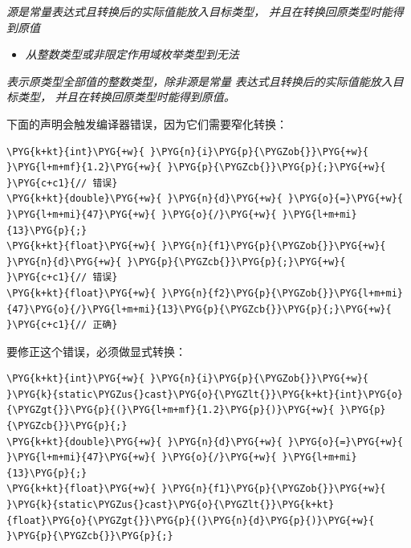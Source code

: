 
\textit{源是常量表达式且转换后的实际值能放入目标类型，} \textit{并且在转换回原类型时能得到原值}



\begin{itemize}
\item \textit{从整数类型或非限定作用域枚举类型到无法}


\end{itemize}



\textit{表示原类型全部值的整数类型，除非源是常量} \textit{表达式且转换后的实际值能放入目标类型，} \textit{并且在转换回原类型时能得到原值。}



下面的声明会触发编译器错误，因为它们需要窄化转换：



\begin{codeblockbg}
\begin{Verbatim}[commandchars=\\\{\},breaklines=true,breakanywhere=true,fontsize=\codefont,xleftmargin=17bp]
\PYG{k+kt}{int}\PYG{+w}{ }\PYG{n}{i}\PYG{p}{\PYGZob{}}\PYG{+w}{ }\PYG{l+m+mf}{1.2}\PYG{+w}{ }\PYG{p}{\PYGZcb{}}\PYG{p}{;}\PYG{+w}{           }\PYG{c+c1}{// 错误}
\PYG{k+kt}{double}\PYG{+w}{ }\PYG{n}{d}\PYG{+w}{ }\PYG{o}{=}\PYG{+w}{ }\PYG{l+m+mi}{47}\PYG{+w}{ }\PYG{o}{/}\PYG{+w}{ }\PYG{l+m+mi}{13}\PYG{p}{;}
\PYG{k+kt}{float}\PYG{+w}{ }\PYG{n}{f1}\PYG{p}{\PYGZob{}}\PYG{+w}{ }\PYG{n}{d}\PYG{+w}{ }\PYG{p}{\PYGZcb{}}\PYG{p}{;}\PYG{+w}{          }\PYG{c+c1}{// 错误}
\PYG{k+kt}{float}\PYG{+w}{ }\PYG{n}{f2}\PYG{p}{\PYGZob{}}\PYG{l+m+mi}{47}\PYG{o}{/}\PYG{l+m+mi}{13}\PYG{p}{\PYGZcb{}}\PYG{p}{;}\PYG{+w}{        }\PYG{c+c1}{// 正确}
\end{Verbatim}
\end{codeblockbg}



要修正这个错误，必须做显式转换：



\begin{codeblockbg}
\begin{Verbatim}[commandchars=\\\{\},breaklines=true,breakanywhere=true,fontsize=\codefont,xleftmargin=17bp]
\PYG{k+kt}{int}\PYG{+w}{ }\PYG{n}{i}\PYG{p}{\PYGZob{}}\PYG{+w}{ }\PYG{k}{static\PYGZus{}cast}\PYG{o}{\PYGZlt{}}\PYG{k+kt}{int}\PYG{o}{\PYGZgt{}}\PYG{p}{(}\PYG{l+m+mf}{1.2}\PYG{p}{)}\PYG{+w}{ }\PYG{p}{\PYGZcb{}}\PYG{p}{;}
\PYG{k+kt}{double}\PYG{+w}{ }\PYG{n}{d}\PYG{+w}{ }\PYG{o}{=}\PYG{+w}{ }\PYG{l+m+mi}{47}\PYG{+w}{ }\PYG{o}{/}\PYG{+w}{ }\PYG{l+m+mi}{13}\PYG{p}{;}
\PYG{k+kt}{float}\PYG{+w}{ }\PYG{n}{f1}\PYG{p}{\PYGZob{}}\PYG{+w}{ }\PYG{k}{static\PYGZus{}cast}\PYG{o}{\PYGZlt{}}\PYG{k+kt}{float}\PYG{o}{\PYGZgt{}}\PYG{p}{(}\PYG{n}{d}\PYG{p}{)}\PYG{+w}{ }\PYG{p}{\PYGZcb{}}\PYG{p}{;}
\end{Verbatim}
\end{codeblockbg}


